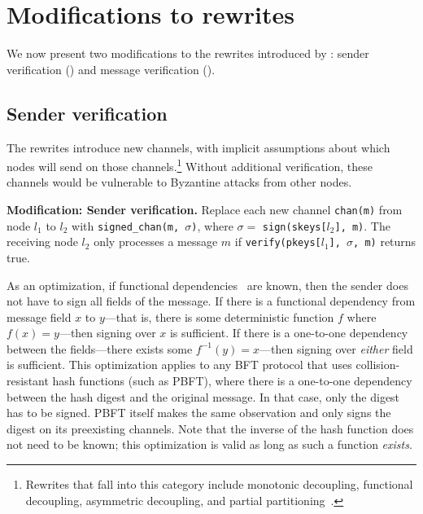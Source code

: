\section{Modifications to rewrites}
\label{sec:modifications-to-rewrites}

We now present two modifications to the rewrites introduced by \sigmodpaper{}: sender verification () and message verification ().

\subsection{Sender verification}
\label{sec:sender-verification}
The rewrites introduce new channels, with implicit assumptions about which nodes will send on those channels.\footnote{Rewrites that fall into this category include monotonic decoupling, functional decoupling, asymmetric decoupling, and partial partitioning~\cite{autocomp}.}
Without additional verification, these channels would be vulnerable to Byzantine attacks from other nodes.

\textbf{Modification: Sender verification.}
Replace each new channel \texttt{chan(m)} from node $l_1$ to $l_2$ with \texttt{signed\_chan(m, $\sigma$)}, where $\sigma =$ \texttt{sign(skeys[$l_2$], m)}.
The receiving node $l_2$ only processes a message $m$ if \texttt{verify(pkeys[$l_1$], $\sigma$, m)} returns true.

As an optimization, if functional dependencies~\cite{autocomp,alice} are known, then the sender does not have to sign all fields of the message.
If there is a functional dependency from message field $x$ to $y$---that is, there is some deterministic function $f$ where $f(x) = y$---then signing over $x$ is sufficient.
If there is a one-to-one dependency between the fields---there exists some $f^{-1}(y) = x$---then signing over \emph{either} field is sufficient.
This optimization applies to any BFT protocol that uses collision-resistant hash functions (such as PBFT), where there is a one-to-one dependency between the hash digest and the original message.
In that case, only the digest has to be signed.
PBFT itself makes the same observation and only signs the digest on its preexisting channels.
Note that the inverse of the hash function does not need to be known; this optimization is valid as long as such a function \emph{exists}.


